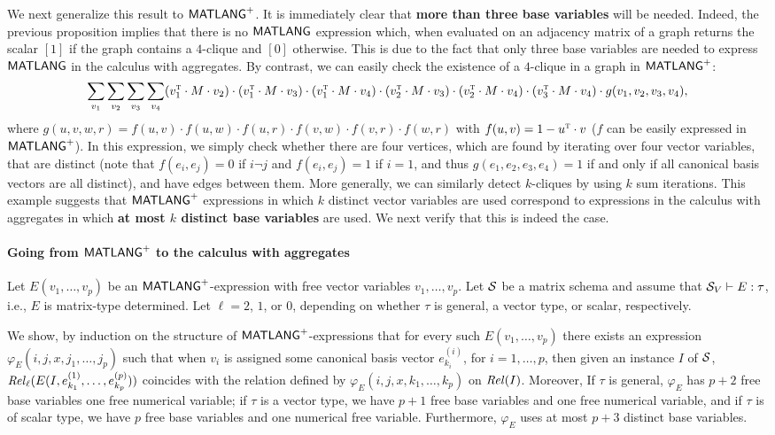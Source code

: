 We next generalize this result to $\mathsf{MATLANG}^{\sf +}$. It is immediately clear that {\bf more than three base variables} will be needed.
Indeed, the previous proposition implies that  there is no $\mathsf{MATLANG}$ expression which, when evaluated
on an adjacency matrix of a graph returns the scalar $[1]$ if the graph contains a $4$-clique and $[0]$ otherwise. This is due to the fact that only three base variables
are needed to express $\mathsf{MATLANG}$ in the calculus with aggregates. By contrast, we can easily check the existence of a $4$-clique in a graph in
$\mathsf{MATLANG}^{\sf +}$:
$$\sum_{v_1}\sum_{v_2}\sum_{v_3}\sum_{v_4} (v_1^{\textsc{t}}\cdot M \cdot v_2)\cdot (v_1^{\textsc{t}}\cdot M\cdot v_3)\cdot (v_1^{\textsc{t}}\cdot M \cdot v_4)\cdot (v_2^{\textsc{t}}\cdot M\cdot v_3)\cdot (v_2^{\textsc{t}}\cdot M\cdot v_4)\cdot (v_3^{\textsc{t}}\cdot M\cdot v_4)\cdot g(v_1,v_2,v_3,v_4),$$
where $g(u,v,w,r)=f(u,v)\cdot f(u,w)\cdot f(u,r)\cdot f(v,w)\cdot f(v,r)\cdot f(w,r)$ with $f(u,v)=1-u^{\textsc{t}}\cdot v$ ($f$ can be easily expressed in $\mathsf{MATLANG}^{\sf +}$).
In this expression, we simply check whether there are four vertices, which are found by iterating over four vector variables, that are distinct (note that $f(e_i,e_j)=0$ if $i\neg j$ and $f(e_i,e_j)=1$ if $i=1$, and
thus $g(e_1,e_2,e_3,e_4)=1$ if and only if all canonical basis vectors are all distinct), and have edges between them.
More generally, we can similarly detect $k$-cliques by using $k$ sum iterations. This example suggests that $\mathsf{MATLANG}^{\sf +}$ expressions in which $k$ distinct vector variables are used correspond to expressions in the calculus with aggregates in which {\bf at most $k$ distinct base variables} are used. We next verify that this is indeed the case.


%

\paragraph{Going from $\mathsf{MATLANG}^{\sf +}$ to the calculus with aggregates}
Let $E(v_1,\ldots,v_p)$ be an $\mathsf{MATLANG}^{\sf +}$-expression with free vector variables $v_1,\ldots,v_p$.
Let $\mathcal{S}$ be a matrix schema and assume that  $\mathcal{S}_V\vdash E:\tau$, i.e., $E$ is matrix-type determined.
Let $\ell=2$, $1$,
or $0$, depending on whether $\tau$ is general, a vector type, or
scalar, respectively.

We show, by induction on the structure of $\mathsf{MATLANG}^{\sf +}$-expressions that for every such $E(v_1,\ldots,\allowbreak v_p)$ there exists an
expression $\varphi_E(i,j,x,j_1,\ldots,j_p)$ such that when $v_i$ is assigned some canonical basis vector $e_{k_i}^{(i)}$,
for $i=1,\ldots,p$, then given an instance $I$ of $\mathcal{S}$, $\mathit{Rel}_\ell(E(I,e_{k_1}^{(1)},\ldots,e_{k_p}^{(p)}))$ coincides with
the relation defined by $\varphi_E(i,j,x,k_1,\ldots,k_p)$ on $\mathit{Rel}(I)$. Moreover, If $\tau$ is general, $\varphi_E$ has $p+2$ free base
variables  one free numerical variable; if 
$\tau$ is a vector type, we have $p+1$ free base variables and one free numerical variable, and if $\tau$ is of scalar type, we have
$p$ free base variables and one numerical free variable. Furthermore, $\varphi_E$ uses at most $p+3$ distinct base variables.

